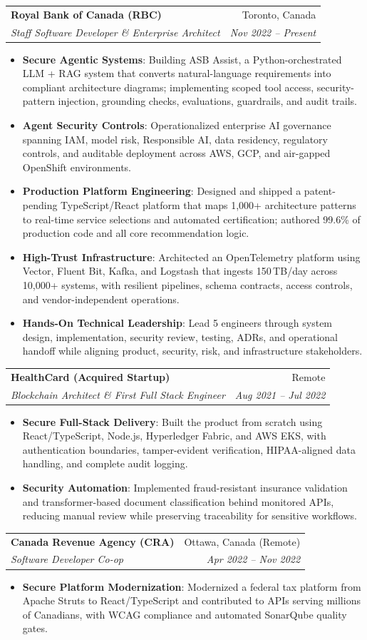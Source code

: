 \documentclass[letterpaper,9.5pt]{article}
\makeatletter
\newcommand{\resumeItem}[2]{\item\small{\textbf{#1}{: #2 \vspace{-2pt}}}}
\newcommand{\resumeSubheading}[4]{\vspace{-2pt}\item\begin{tabular*}{0.97\textwidth}{l@{\extracolsep{\fill}}r}\textbf{#1} & #2 \\\textit{\small#3} & \textit{\small #4} \\\end{tabular*}\vspace{-6pt}}
\newcommand{\resumeItemListStart}{\begin{itemize}}
\newcommand{\resumeItemListEnd}{\end{itemize}\vspace{-6pt}}
\makeatother
\begin{document}
  \resumeSubheading
    {Royal Bank of Canada (RBC)}{Toronto, Canada}
    {Staff Software Developer \& Enterprise Architect}{Nov 2022 -- Present}
  \resumeItemListStart
    \resumeItem{Secure Agentic Systems}
      {Building ASB Assist, a Python-orchestrated LLM + RAG system that converts natural-language requirements into compliant architecture diagrams; implementing scoped tool access, security-pattern injection, grounding checks, evaluations, guardrails, and audit trails.}
    \resumeItem{Agent Security Controls}
      {Operationalized enterprise AI governance spanning IAM, model risk, Responsible AI, data residency, regulatory controls, and auditable deployment across AWS, GCP, and air-gapped OpenShift environments.}
    \resumeItem{Production Platform Engineering}
      {Designed and shipped a patent-pending TypeScript/React platform that maps 1,000+ architecture patterns to real-time service selections and automated certification; authored 99.6\% of production code and all core recommendation logic.}
    \resumeItem{High-Trust Infrastructure}
      {Architected an OpenTelemetry platform using Vector, Fluent Bit, Kafka, and Logstash that ingests 150\,TB/day across 10,000+ systems, with resilient pipelines, schema contracts, access controls, and vendor-independent operations.}
    \resumeItem{Hands-On Technical Leadership}
      {Lead 5 engineers through system design, implementation, security review, testing, ADRs, and operational handoff while aligning product, security, risk, and infrastructure stakeholders.}
  \resumeItemListEnd

  \resumeSubheading
    {HealthCard (Acquired Startup)}{Remote}
    {Blockchain Architect \& First Full Stack Engineer}{Aug 2021 -- Jul 2022}
  \resumeItemListStart
    \resumeItem{Secure Full-Stack Delivery}
      {Built the product from scratch using React/TypeScript, Node.js, Hyperledger Fabric, and AWS EKS, with authentication boundaries, tamper-evident verification, HIPAA-aligned data handling, and complete audit logging.}
    \resumeItem{Security Automation}
      {Implemented fraud-resistant insurance validation and transformer-based document classification behind monitored APIs, reducing manual review while preserving traceability for sensitive workflows.}
  \resumeItemListEnd

  \resumeSubheading
    {Canada Revenue Agency (CRA)}{Ottawa, Canada (Remote)}
    {Software Developer Co-op}{Apr 2022 -- Nov 2022}
  \resumeItemListStart
    \resumeItem{Secure Platform Modernization}
      {Modernized a federal tax platform from Apache Struts to React/TypeScript and contributed to APIs serving millions of Canadians, with WCAG compliance and automated SonarQube quality gates.}
  \resumeItemListEnd
\end{document}

